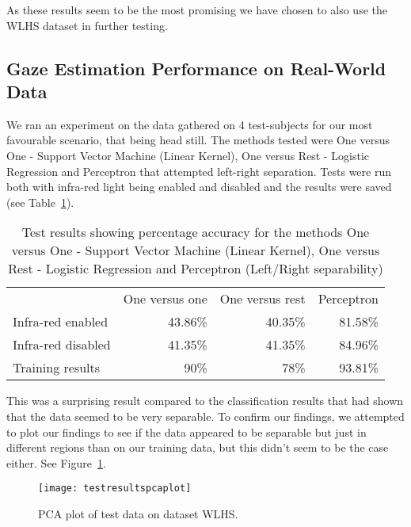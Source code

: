   As these results seem to be the most promising we have chosen to also use the WLHS dataset in further testing.

\subsection{Gaze Estimation Performance on Real-World Data}
\label{sub:GazeEstimationPerformanceonReal-WorldData}
We ran an experiment on the data gathered on 4 test-subjects for our most favourable scenario, that being head still. 
The methods tested were One versus One - Support Vector Machine (Linear Kernel), One versus Rest - Logistic Regression and Perceptron that attempted left-right separation.
Tests were run both with infra-red light being enabled and disabled and the results were saved (see Table~\ref{tab:test results}).

\begin{table}[h!]
\centering
\begin{tabular}{l|rrr}
\hline
\noalign{\smallskip}
 & One versus one & One versus rest & Perceptron\\
\noalign{\smallskip}
\hline
\noalign{\smallskip}
Infra-red enabled & 43.86\% & 40.35\% & 81.58\% \\
Infra-red disabled & 41.35\% & 41.35\% & 84.96\% \\
\hline
Training results & 90\% & 78\% & 93.81\% \\
\hline
\end{tabular}
\caption{Test results showing percentage accuracy for the methods One versus One - Support Vector Machine (Linear Kernel), One versus Rest - Logistic Regression and Perceptron (Left/Right separability)}\label{tab:test results}
\end{table}

This was a surprising result compared to the classification results that had shown that the data seemed to be very separable.
To confirm our findings, we attempted to plot our findings to see if the data appeared to be separable but just in different regions than on our training data, but this didn't seem to be the case either.
See Figure~\ref{fig:testresultspcaplot}.

\begin{figure}[h!]
\centering
\texttt{[image: testresultspcaplot]}
\caption{PCA plot of test data on dataset WLHS.}
\label{fig:testresultspcaplot}
\end{figure}

